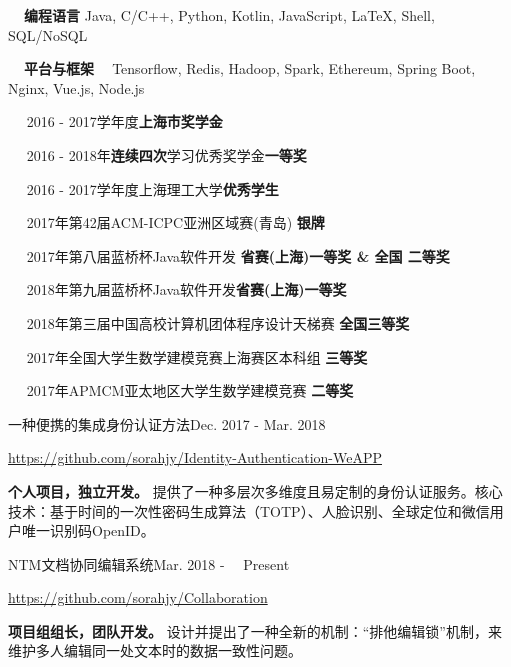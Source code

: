 \documentclass{sorahjy_cv}
\begin{document}
%
%

\begin{description}{}
	\item{\textbf{\ \ 编程语言 \quad }} Java, C/C++, Python, Kotlin, JavaScript, \LaTeX, Shell, SQL/NoSQL
	\item{\textbf{\ \ 平台与框架 \ }} Tensorflow, Redis, Hadoop, Spark, Ethereum, Spring Boot, Nginx, Vue.js, Node.js 
\end{description}


%
%

\begin{description}{}
	\item{\ \ } 2016 - 2017学年度\textbf{上海市奖学金}
	\item{\ \ } 2016 - 2018年\textbf{连续四次}学习优秀奖学金\textbf{一等奖}
	\item{\ \ } 2016 - 2017学年度上海理工大学\textbf{优秀学生}
	\item{\ \ } 2017年第42届ACM-ICPC亚洲区域赛(青岛) \hfill \textbf{银牌}
	\item{\ \ } 2017年第八届蓝桥杯Java软件开发 \hfill \textbf{省赛(上海)一等奖 \& 全国 二等奖}
	\item{\ \ } 2018年第九届蓝桥杯Java软件开发\hfill \textbf{省赛(上海)一等奖}
	\item{\ \ } 2018年第三届中国高校计算机团体程序设计天梯赛 \hfill \textbf{全国三等奖}
	\item{\ \ } 2017年全国大学生数学建模竞赛上海赛区本科组 \hfill \textbf{三等奖}
	\item{\ \ } 2017年APMCM亚太地区大学生数学建模竞赛 \hfill \textbf{二等奖}

\end{description}


%
%


\begin{sectionContentSimple}{一种便携的集成身份认证方法}{Dec. 2017 - Mar. 2018}
	\item \url{https://github.com/sorahjy/Identity-Authentication-WeAPP}
	\item \textbf{个人项目，独立开发。} 提供了一种多层次多维度且易定制的身份认证服务。核心技术：基于时间的一次性密码生成算法（TOTP）、人脸识别、全球定位和微信用户唯一识别码OpenID。
\end{sectionContentSimple}

\begin{sectionContentSimple}{NTM文档协同编辑系统}{Mar. 2018 - \ \ Present \ }
	\item \url{https://github.com/sorahjy/Collaboration}
	\item \textbf{项目组组长，团队开发。} 设计并提出了一种全新的机制：“排他编辑锁”机制，来维护多人编辑同一处文本时的数据一致性问题。
\end{sectionContentSimple}
\end{document}
